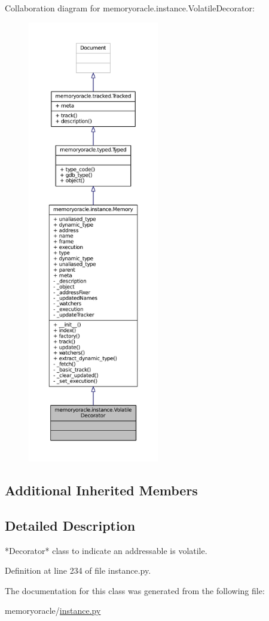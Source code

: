 Collaboration diagram for memoryoracle.\+instance.\+Volatile\+Decorator\+:
\nopagebreak
\begin{figure}[H]
\begin{center}
\leavevmode
\includegraphics[height=550pt]{classmemoryoracle_1_1instance_1_1VolatileDecorator__coll__graph}
\end{center}
\end{figure}
\subsection*{Additional Inherited Members}


\subsection{Detailed Description}
\begin{DoxyVerb}*Decorator* class to indicate an addressable is volatile.
\end{DoxyVerb}
 

Definition at line 234 of file instance.\+py.



The documentation for this class was generated from the following file\+:\begin{DoxyCompactItemize}
\item 
memoryoracle/\hyperlink{instance_8py}{instance.\+py}\end{DoxyCompactItemize}
